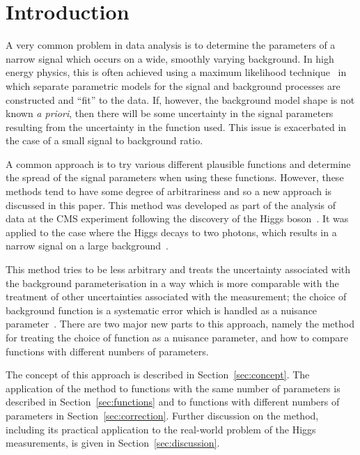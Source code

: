 \section{Introduction} %
\label{sec:introduction}

A very common problem in data analysis is to determine the parameters of
a narrow signal which occurs on a wide, smoothly varying background. 
In high energy physics, this is often achieved using a maximum likelihood technique~\cite{ref:Fisher01011922} 
in which separate parametric models for the signal and background processes are constructed and 
``fit'' to the data.
If, however, the background model shape is not known {\it a priori}, then there will be 
some uncertainty in the signal parameters resulting from the uncertainty in
the function used. This issue is exacerbated in the case of a small signal to
background ratio.

A common approach is to try various different plausible functions and 
determine the spread of the signal parameters when using these functions.
However, these methods tend to have some degree of arbitrariness and so
a new approach is discussed in this paper.
This method was developed as part of the analysis of data at the CMS experiment
following the discovery of the Higgs
boson~\cite{ref:introduction:atlasdis,ref:introduction:cmsdis}.
It was applied to the case where the Higgs decays to two photons, which
results in a narrow signal on a large 
background~\cite{ref:introduction:legacy}.

This method tries to be less 
arbitrary and treats the uncertainty associated with the
background parameterisation in a way
which is more comparable with the treatment of other 
uncertainties associated with the measurement; the choice of background function 
is a systematic error which is handled as a nuisance parameter~\cite{ref:intro:nusiances}.
There are two major new parts to this approach, namely the method for
treating the choice of function as a nuisance parameter, and how to compare 
functions with different numbers of parameters.

The concept of this approach is described in Section~\ref{sec:concept}.
The application of the method to functions with the same number of parameters
is described in Section~\ref{sec:functions} and to functions with different
numbers of parameters in Section~\ref{sec:correction}. Further discussion on
the method, including its practical application to the real-world problem of
the Higgs measurements, is given in Section~\ref{sec:discussion}.


